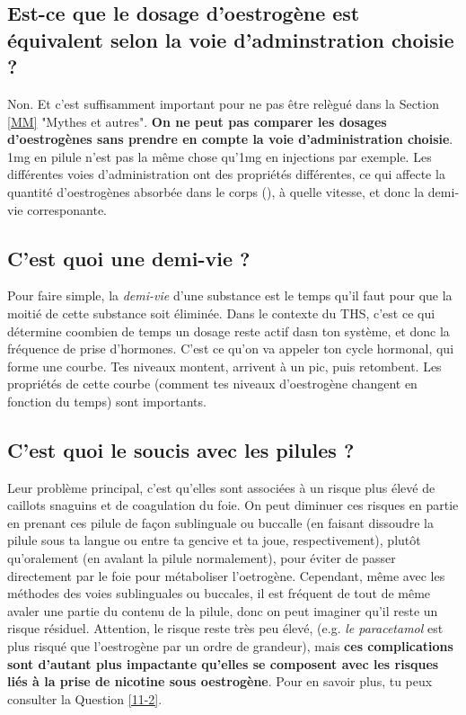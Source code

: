 \documentclass{article}
\begin{document}
\subsection{Est-ce que le dosage d'oestrogène est équivalent selon la voie d'adminstration choisie ?}

Non. Et c'est suffisamment important pour ne pas être relègué dans la Section \ref{MM} "Mythes et autres". \textbf{On ne peut pas comparer les dosages d'oestrogènes sans prendre en compte la voie d'administration choisie}. 1mg en pilule n'est pas la même chose qu'1mg en injections par exemple. Les différentes voies d'administration ont des propriétés différentes, ce qui affecte la quantité d'oestrogènes absorbée dans le corps (), à quelle vitesse, et donc la demi-vie corresponante.

\subsection{C'est quoi une demi-vie ?}

Pour faire simple, la \textit{demi-vie} d'une substance est le temps qu'il faut pour que la moitié de cette substance soit éliminée. Dans le contexte du THS, c'est ce qui détermine coombien de temps un dosage reste actif dasn ton système, et donc la fréquence de prise d'hormones. C'est ce qu'on va appeler ton cycle hormonal, qui forme une courbe. Tes niveaux montent, arrivent à un pic, puis retombent. Les propriétés de cette courbe (comment tes niveaux d'oestrogène changent en fonction du temps) sont importants.

\subsection{C'est quoi le soucis avec les pilules ?}

Leur problème principal, c'est qu'elles sont associées à un risque plus élevé de caillots snaguins et de coagulation du foie. On peut diminuer ces risques en partie en prenant ces pilule de façon sublinguale ou buccalle (en faisant dissoudre la pilule sous ta langue ou entre ta gencive et ta joue, respectivement), plutôt qu'oralement (en avalant la pilule normalement), pour éviter de passer directement par le foie pour métaboliser l'oetrogène. Cependant, même avec les méthodes des voies sublinguales ou buccales, il est fréquent de tout de même avaler une partie du contenu de la pilule, donc on peut imaginer qu'il reste un risque résiduel. Attention, le risque reste très peu élevé, (e.g. \textit{le paracetamol} est plus risqué que l'oestrogène par un ordre de grandeur), mais \textbf{ces complications sont d'autant plus impactante qu'elles se composent avec les risques liés à la prise de nicotine sous oestrogène}. Pour en savoir plus, tu peux consulter la Question \ref{11-2}. 
\end{document}
